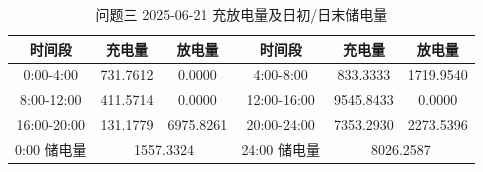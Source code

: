 \begin{table}[htbp]
\centering
\caption{问题三 2025-06-21 充放电量及日初/日末储电量}\label{tab:q3-storage}
\normalsize\setlength{\tabcolsep}{5pt}
\begin{tabular}{@{}cccccc@{}}
\toprule
时间段 & 充电量 & 放电量 & 时间段 & 充电量 & 放电量 \\
\midrule
0:00-4:00 & 731.7612 & 0.0000 & 4:00-8:00 & 833.3333 & 1719.9540 \\
8:00-12:00 & 411.5714 & 0.0000 & 12:00-16:00 & 9545.8433 & 0.0000 \\
16:00-20:00 & 131.1779 & 6975.8261 & 20:00-24:00 & 7353.2930 & 2273.5396 \\
0:00 储电量 & \multicolumn{2}{c}{1557.3324} & 24:00 储电量 & \multicolumn{2}{c}{8026.2587} \\
\bottomrule
\end{tabular}
\end{table}
